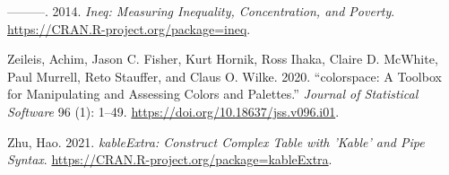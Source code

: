 \documentclass{article}
\newlength{\cslhangindent}
\newlength{\cslentryspacingunit} %
\newenvironment{CSLReferences}[2] %
 {%
  \setlength{\parindent}{0pt}
  \ifodd #1
  \let\oldpar\par
  \def\par{\hangindent=\cslhangindent\oldpar}
  \fi
  \setlength{\parskip}{#2\cslentryspacingunit}
 }%
 {}
\begin{document}
\begin{CSLReferences}{1}{0}
\leavevmode{}%
---------. 2014. \emph{Ineq: Measuring Inequality, Concentration, and
Poverty}. \url{https://CRAN.R-project.org/package=ineq}.

\leavevmode{}%
Zeileis, Achim, Jason C. Fisher, Kurt Hornik, Ross Ihaka, Claire D.
McWhite, Paul Murrell, Reto Stauffer, and Claus O. Wilke. 2020.
{``{colorspace}: A Toolbox for Manipulating and Assessing Colors and
Palettes.''} \emph{Journal of Statistical Software} 96 (1): 1--49.
\url{https://doi.org/10.18637/jss.v096.i01}.

\leavevmode{}%
Zhu, Hao. 2021. \emph{kableExtra: Construct Complex Table with 'Kable'
and Pipe Syntax}. \url{https://CRAN.R-project.org/package=kableExtra}.

\end{CSLReferences}



\end{document}
